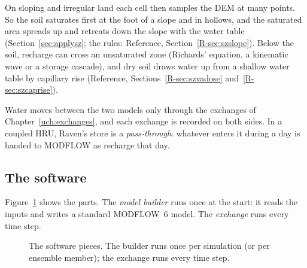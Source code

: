 On sloping and irregular land each cell then samples the DEM at many points. So the soil saturates first at the foot of
a slope and in hollows, and the saturated area spreads up and retreats down the slope with the water table
(Section~\ref{sec:applysz}; the rules: Reference, Section~\ref{R-sec:szslope}). Below the soil, recharge can cross an
unsaturated zone (Richards' equation, a kinematic wave or a storage cascade), and dry soil draws water up from a shallow
water table by capillary rise (Reference, Sections~\ref{R-sec:szvadose} and~\ref{R-sec:szcaprise}).

Water moves between the two models only through the exchanges of Chapter~\ref{uch:exchanges}, and each exchange is
recorded on both sides. In a coupled HRU, Raven's  store is a \emph{pass-through}: whatever enters it
during a day is handed to MODFLOW as recharge that day.

\subsection{The software}
Figure~\ref{fig:arch} shows the parts. The \emph{model builder} runs once at the start: it reads the inputs and writes a
standard MODFLOW~6 model. The \emph{exchange} runs every time step.
\begin{figure}[!htbp]\centering
{}
\caption{The software pieces. The builder runs once per simulation (or per ensemble member); the exchange runs every
time step.}\label{fig:arch}
\end{figure}

